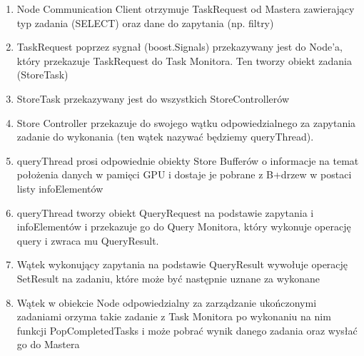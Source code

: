 \documentclass[paper=a4, fontsize=11pt]{scrartcl} %
\numberwithin{equation}{section} %
\numberwithin{figure}{section} %
\numberwithin{table}{section} %
\begin{document}
		\begin{enumerate}
			\item Node Communication Client otrzymuje TaskRequest od Mastera zawierający typ zadania (SELECT) oraz dane do zapytania (np. filtry)
			\item TaskRequest poprzez sygnał (boost.Signals) przekazywany jest do Node'a, który przekazuje TaskRequest do Task Monitora. Ten tworzy 
				obiekt zadania (StoreTask)
			\item StoreTask przekazywany jest do wszystkich StoreControllerów
			\item Store Controller przekazuje do swojego wątku odpowiedzialnego za zapytania zadanie do wykonania (ten wątek nazywać będziemy queryThread). 
			\item queryThread prosi odpowiednie obiekty Store Bufferów o informacje na temat położenia danych w pamięci GPU i dostaje je pobrane z B+drzew w postaci listy infoElementów
			\item queryThread tworzy obiekt QueryRequest na podstawie zapytania i infoElementów i przekazuje go do Query Monitora, który wykonuje operację query i zwraca mu QueryResult. 
			\item Wątek wykonujący zapytania na podstawie QueryResult wywołuje operację SetResult na zadaniu, które może być następnie uznane za wykonane
			\item Wątek w obiekcie Node odpowiedzialny za zarządzanie ukończonymi zadaniami orzyma takie zadanie z Task Monitora po wykonaniu na nim funkcji PopCompletedTasks
				i może pobrać wynik danego zadania oraz wysłać go do Mastera 
		\end{enumerate}
\end{document}
